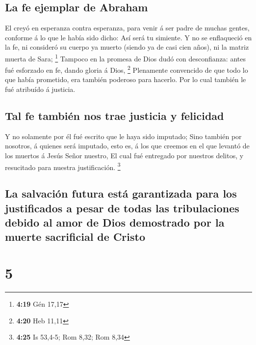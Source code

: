 \hypertarget{la-fe-ejemplar-de-abraham}{%
\subsection{La fe ejemplar de Abraham}\label{la-fe-ejemplar-de-abraham}}

 El creyó en esperanza contra esperanza, para venir á ser
padre de muchas gentes, conforme á lo que le había sido dicho: Así será
tu simiente.  Y no se enflaqueció en la fe, ni consideró
su cuerpo ya muerto (siendo ya de casi cien años), ni la matriz muerta
de Sara; \footnote{\textbf{4:19} Gén 17,17}  Tampoco en
la promesa de Dios dudó con desconfianza: antes fué esforzado en fe,
dando gloria á Dios, \footnote{\textbf{4:20} Heb 11,11} 
Plenamente convencido de que todo lo que había prometido, era también
poderoso para hacerlo.  Por lo cual también le fué
atribuído á justicia.

\hypertarget{tal-fe-tambiuxe9n-nos-trae-justicia-y-felicidad}{%
\subsection{Tal fe también nos trae justicia y
felicidad}\label{tal-fe-tambiuxe9n-nos-trae-justicia-y-felicidad}}

 Y no solamente por él fué escrito que le haya sido
imputado;  Sino también por nosotros, á quienes será
imputado, esto es, á los que creemos en el que levantó de los muertos á
Jesús Señor nuestro,  El cual fué entregado por nuestros
delitos, y resucitado para nuestra justificación. \footnote{\textbf{4:25}
  Is 53,4-5; Rom 8,32; Rom 8,34}

\hypertarget{la-salvaciuxf3n-futura-estuxe1-garantizada-para-los-justificados-a-pesar-de-todas-las-tribulaciones-debido-al-amor-de-dios-demostrado-por-la-muerte-sacrificial-de-cristo}{%
\subsection{La salvación futura está garantizada para los justificados a
pesar de todas las tribulaciones debido al amor de Dios demostrado por
la muerte sacrificial de
Cristo}\label{la-salvaciuxf3n-futura-estuxe1-garantizada-para-los-justificados-a-pesar-de-todas-las-tribulaciones-debido-al-amor-de-dios-demostrado-por-la-muerte-sacrificial-de-cristo}}

\hypertarget{section-4}{%
\section{5}\label{section-4}}

